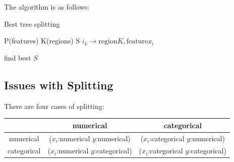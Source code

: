 \documentclass{article}
\begin{document}
{     The algorithm is as follows:
     
     \begin{algorithm}
     	\caption{Best tree splitting}
     	\label{alg1}
     	\begin{algorithmic}
     		\REQUIRE P(features) K(regions)
     		\ENSURE S
     		\STATE
     		\STATE $i_k\rightarrow \text{region}K,\text{feature}x_i$
     	
     		\ENDFOR 
     		\ENDFOR
     		\STATE find best $S$
     	\end{algorithmic}
     \end{algorithm}
     
\subsection{Issues with Splitting}

There are four cases of splitting:

  \begin{center}{
 		\begin{tabular}{c|c c}
 			
 			\diagbox{$y$}{$x_i$} & numerical & categorical\\
 			\hline
 			numerical & ($x_i$:numerical $y$:numerical) & ($x
 			_i$:categorical $y$:numerical) \\
 			
 			categorical & ($x_i$:numerical $y$:categorical) & ($x_i$:categorical $y$:categorical)\\
 			
 			
 		\end{tabular}
 	}
 \end{center}	}
\end{document}
